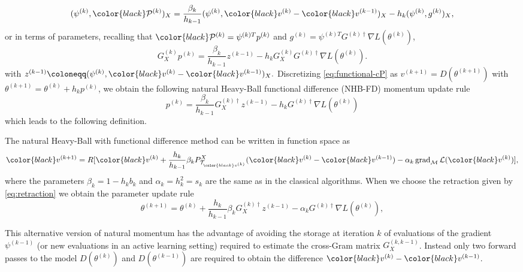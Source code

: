 \documentclass{article}
\theoremstyle{noparens}
\newcommand{\cL}{\mathcal{L}}
\newcommand{\cT}{\mathcal{T}}
\newcommand{\cM}{\mathcal{M}}
\newcommand{\cP}{\mathcal{P}}
\newcommand{\colorM}{\color{black}}
\newcommand{\colorT}{\color{black}}
\newcommand{\paramk}{\theta^{(k)}}
\newcommand{\paramkm}{\theta^{(k-1)}}
\newcommand{\paramkp}{\theta^{(k+1)}}
\newcommand{\vk}{{\colorM v^{(k)}}}
\newcommand{\vkm}{{\colorM v^{(k-1)}}}
\newcommand{\vkp}{{\colorM v^{(k+1)}}}
\newcommand{\psik}{\psi^{(k)}}
\newcommand{\psikm}{\psi^{(k-1)}}
\newcommand{\psikT}{\psi^{(k)T}}
\newcommand{\pk}{p^{(k)}}
\newcommand{\Pk}{{\colorT \cP^{(k)}}}
\newcommand{\gk}{g^{(k)}}
\newcommand{\Ginvk}{{G^{(k)\dagger}}}
\newcommand{\GXk}{{G^{(k)}_X}}
\newcommand{\GXinvk}{{G^{(k)\dagger}_X}}
\newcommand{\GXkkm}{{G^{(k,k-1)}_X}}
\newcommand{\GradP}{\nabla}
\newcommand{\LossGrad}{\GradP L}
\newcommand{\gradM}{\operatorname{grad}_{\cM}}
\begin{document}
\begin{equation}
({\psik, \Pk})_X = \frac{\beta_k}{h_{k-1}} ({\psik, \vk-\vkm})_X - h_k ({\psik, \gk})_X, \label{eq:momentum-tangent-space-fd}
\end{equation}
or in terms of parameters, recalling that $\Pk=\psikT\pk$ and $\gk=\psikT\Ginvk\LossGrad(\paramk)$,
\begin{equation}
\GXk\pk = \frac{\beta_k}{h_{k-1}}z^{(k-1)} - h_k\GXk \Ginvk\LossGrad(\paramk). \label{eq:nhbfd-momentum-eq}
\end{equation}
with $z^{(k-1)}\coloneqq ({\psik, \vk-\vkm})_X.$
Discretizing \eqref{eq:functional-cP} as $v^{(k+1)} = D(\theta^{(k+1)})$ with $ \paramkp = \paramk + h_k \pk$,
we obtain the following natural Heavy-Ball functional difference (NHB-FD) momentum update rule
\begin{equation}
\pk = \frac{\beta_k}{h_{k-1}}\GXinvk z^{(k-1)} - h_k\Ginvk\LossGrad(\paramk) \label{eq:nhbfd-momentum-update}
\end{equation}
which leads to the following definition. 
\begin{definition}
The natural Heavy-Ball with functional difference method can be written in function space as
\begin{align*}
    \vkp = R[\vk + \frac{h_k }{h_{k-1}}\beta_k P^X_{\cT_{\vk}} (\vk-\vkm)  - \alpha_k \gradM \cL(\vk)],
\end{align*}
where the parameters  $\beta_k=1-h_k b_k$ and $\alpha_k=h_k^2=s_k$ are the same as in the classical algorithms.
When we choose the retraction given by \eqref{eq:retraction} we obtain the parameter update rule
\begin{equation}
    \paramkp
= \paramk + \frac{h_k}{h_{k-1}}\beta_k\GXinvk z^{(k-1)} - \alpha_k\Ginvk\LossGrad(\paramk), \label{eq:nhbfd-update}
\end{equation}
\end{definition}


This alternative version of natural momentum has the advantage of avoiding the storage at iteration $k$ of evaluations of the gradient $\psikm$ (or new evaluations in an active learning setting) required to estimate the cross-Gram matrix $\GXkkm$. Instead only two forward passes to the model $D(\paramk)$ and $D(\paramkm)$ are required to obtain the difference $\vk-\vkm$.
\end{document}
